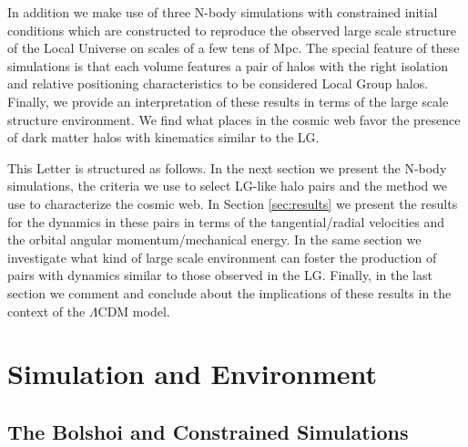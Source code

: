 \documentclass{emulateapj}
\begin{document}
In addition we make use of three N-body simulations with constrained initial conditions which are constructed to reproduce the observed large scale structure of the Local Universe on scales of a few tens of Mpc. The special feature of these simulations is that each volume features a pair of halos with the right isolation and relative positioning characteristics to be considered Local Group halos.  Finally, we provide an interpretation of these results in terms of the large scale structure environment. We find what places in the cosmic web favor the presence of dark matter halos with kinematics similar to the LG.

This Letter is structured as follows. In the next section we present the N-body simulations, the criteria we use to select LG-like halo pairs and the method we use to characterize the cosmic web. In Section \ref{sec:results} we present the results for the dynamics in these pairs in terms of the tangential/radial velocities and the orbital angular momentum/mechanical energy. In the same section we investigate what kind of large scale environment can foster the production of pairs with dynamics similar to those observed in the LG. Finally, in the last section we comment and conclude about the implications of these results in the context of the $\Lambda$CDM model.

\section{Simulation and Environment}
\label{sec:methods}
\subsection{The Bolshoi and Constrained Simulations}
\end{document}
